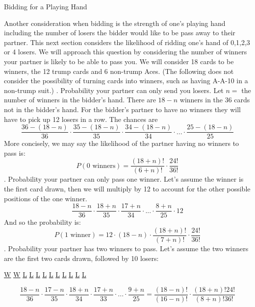 \documentclass[11pt]{article}
\begin{document}
\begin{center}
  Bidding for a Playing Hand
\end{center}
\indent
Another consideration when bidding is the strength of one's playing hand including the number of losers the bidder would like to be pass away to their partner. This next section considers the likelihood of ridding one's hand of 0,1,2,3 or 4 losers. We will approach this question by considering the number of winners your partner is likely to be able to pass you. We will consider 18 cards to be winners, the 12 trump cards and 6 non-trump Aces. (The following does not consider the possibility of turning cards into winners, such as having A-A-10 in a non-trump suit.)
. Probability your partner can only send you losers. Let $n=$ the number of winners in the bidder's hand. There are $18-n$ winners in the 36 cards not in the bidder's hand. For the bidder's partner to have no winners they will have to pick up 12 losers in a row. The chances are
\begin{equation}
  \frac{36-(18-n)}{36} \cdot \frac{35-(18-n)}{35}\cdot \frac{34-(18-n)}{34}\cdot ...\cdot \frac{25-(18-n)}{25}
\end{equation}
More concisely, we may say the likelihood of the partner having no winners to pass is:
\begin{equation}
 P(0\text{ winners})= \frac{(18+n)!}{(6+n)!}\cdot \frac{24!}{36!}
\end{equation}
. Probability your partner can only pass one winner. Let's assume the winner is the first card drawn, then we will multiply by 12 to account for the other possible positions of the one winner.
\begin{equation}
\frac{18-n}{36}\cdot \frac{18+n}{35}\cdot \frac {17+n}{34}\cdot ...\cdot \frac{8+n}{25} \cdot 12
\end {equation}
And so the probability is:
\begin{equation}
 P(1 \text{ winner})= 12\cdot (18-n)\cdot \frac{(18+n)!}{(7+n)!}\cdot \frac{24!}{36!}
\end{equation}
. Probability your partner has two winners to pass. Let's assume the two winners are the first two cards drawn, followed by 10 losers:\\
\begin {center}
\underline{W} \underline{W} \underline{L} \underline{L} \underline{L} \underline{L} \underline{L} \underline{L} \underline{L} \underline{L} \underline{L} \underline{L}
\end {center}
\begin {equation}
\frac{18-n}{36}\cdot \frac{17-n}{35}\cdot \frac{18+n}{34} \cdot \frac{17+n}{33}\cdot ...\cdot \frac {9+n}{25}=\frac{(18-n)!}{(16-n)!}\cdot \frac{(18+n)!24!}{(8+n)!36!}
\end{equation}
\end{document}
